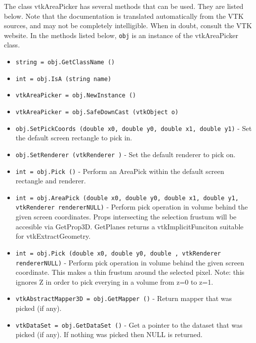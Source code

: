 The class vtkAreaPicker has several methods that can be used.
  They are listed below.
Note that the documentation is translated automatically from the VTK sources,
and may not be completely intelligible.  When in doubt, consult the VTK website.
In the methods listed below, \verb|obj| is an instance of the vtkAreaPicker class.
\begin{itemize}
\item  \verb|string = obj.GetClassName ()|

\item  \verb|int = obj.IsA (string name)|

\item  \verb|vtkAreaPicker = obj.NewInstance ()|

\item  \verb|vtkAreaPicker = obj.SafeDownCast (vtkObject o)|

\item  \verb|obj.SetPickCoords (double x0, double y0, double x1, double y1)| -  Set the default screen rectangle to pick in.

\item  \verb|obj.SetRenderer (vtkRenderer )| -  Set the default renderer to pick on.

\item  \verb|int = obj.Pick ()| -  Perform an AreaPick within the default screen rectangle and renderer.

\item  \verb|int = obj.AreaPick (double x0, double y0, double x1, double y1, vtkRenderer rendererNULL)| -  Perform pick operation in volume behind the given screen coordinates.
 Props intersecting the selection frustum will be accesible via GetProp3D.
 GetPlanes returns a vtkImplicitFunciton suitable for vtkExtractGeometry.

\item  \verb|int = obj.Pick (double x0, double y0, double , vtkRenderer rendererNULL)| -  Perform pick operation in volume behind the given screen coordinate.
 This makes a thin frustum around the selected pixel.
 Note: this ignores Z in order to pick everying in a volume from z=0 to z=1.

\item  \verb|vtkAbstractMapper3D = obj.GetMapper ()| -  Return mapper that was picked (if any).

\item  \verb|vtkDataSet = obj.GetDataSet ()| -  Get a pointer to the dataset that was picked (if any). If nothing 
 was picked then NULL is returned.


\end{itemize}

